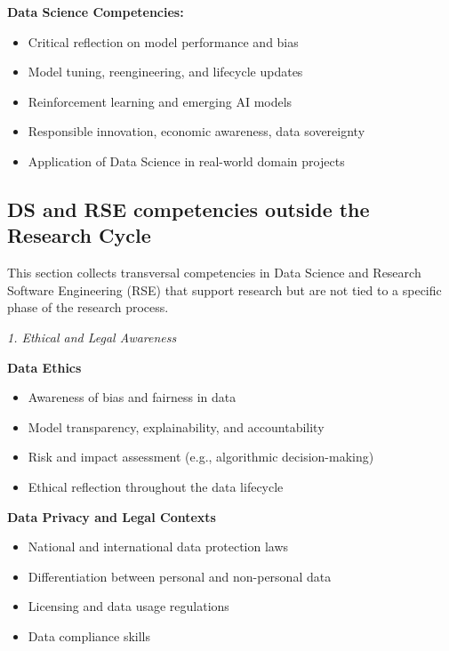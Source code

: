 \documentclass[
        english,biblatex
    ]{lni}
\providecommand{\tightlist}{%
    \setlength{\itemsep}{0pt}\setlength{\parskip}{0pt}}
\begin{document}
    \textbf{Data Science Competencies:}

    \begin{itemize}
    \tightlist
    \item
      Critical reflection on model performance and bias
    \item
      Model tuning, reengineering, and lifecycle updates
    \item
      Reinforcement learning and emerging AI models
    \item
      Responsible innovation, economic awareness, data sovereignty
    \item
      Application of Data Science in real-world domain projects
    \end{itemize}

    \subsection{DS and RSE competencies outside the Research
    Cycle}\label{ds-and-rse-competencies-outside-the-research-cycle}

    This section collects transversal competencies in Data Science and
    Research Software Engineering (RSE) that support research but are
    not tied to a specific phase of the research process.

    \emph{1. Ethical and Legal Awareness}

    \textbf{Data Ethics}

    \begin{itemize}
    \tightlist
    \item
      Awareness of bias and fairness in data
    \item
      Model transparency, explainability, and accountability
    \item
      Risk and impact assessment (e.g., algorithmic decision-making)
    \item
      Ethical reflection throughout the data lifecycle
    \end{itemize}

    \textbf{Data Privacy and Legal Contexts}

    \begin{itemize}
    \tightlist
    \item
      National and international data protection laws
    \item
      Differentiation between personal and non-personal data
    \item
      Licensing and data usage regulations
    \item
      Data compliance skills
    \end{itemize}
\end{document}
